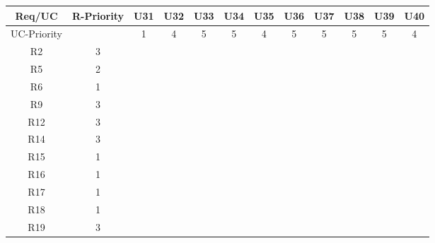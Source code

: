 \documentclass{article}
\begin{document}
\begin{longtable}{|c|c|c|c|c|c|c|c|c|c|c|c|}
	Req/UC      & R-Priority & U31      & U32      & U33      & U34      & U35      & U36      & U37      & U38      & U39      & U40      \\
	\hline
	UC-Priority &            & 1         & 4         & 5         & 5         & 4         & 5         & 5         & 5         & 5         & 4         \\
	\hline
	R2          & 3          &           &           &           &           &           &           &           &           &           &           \\
	\hline
	R5          & 2          &           &           &           &           &           &           &           &           &           &           \\
	\hline
	R6          & 1          &           &           &           &           &           &           &           &           &           &           \\
	\hline
	R9          & 3          &           &           &           &           &           &           &           &           &           &           \\
	\hline
	R12         & 3          &           &           &           &           &           &           &           &           & \ding{51} &           \\
	\hline
	R14         & 3          &           &           &           &           &           &           &           &           &           &           \\
	\hline
	R15         & 1          &           &           &           &           &           &           &           &           &           &           \\
	\hline
	R16         & 1          &           &           &           &           &           &           &           &           &           &           \\
	\hline
	R17         & 1          &           &           &           &           &           &           &           &           &           &           \\
	\hline
	R18         & 1          &           &           &           &           &           &           &           &           &           &           \\
	\hline
	R19         & 3          &           &           &           &           &           &           &           &           &           &           \\

\end{longtable}
\end{document}
